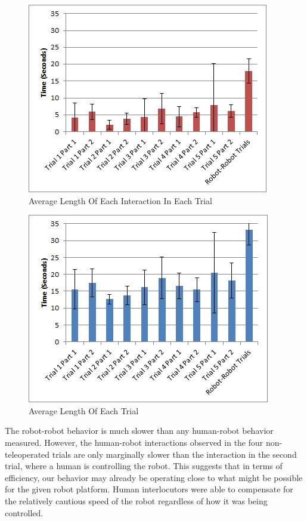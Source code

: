 \documentclass[letterpaper, 10 pt, conference]{ieeeconf}  %
\begin{document}
       \begin{figure}
      \centering
      \includegraphics{interaction_length.png}
      \caption{Average Length Of Each Interaction In Each Trial}
      \label{fig:Interaction}
   \end{figure}


     \begin{figure}
      \centering
      \includegraphics{trial_length.png}
      \caption{Average Length Of Each Trial}
      \label{fig:Trial}
   \end{figure}

The robot-robot behavior is much slower than any human-robot behavior measured. However, the human-robot interactions observed in the four non-teleoperated trials are only marginally slower than the interaction in the second trial, where a human is controlling the robot. This suggests that in terms of efficiency, our behavior may already be operating close to what might be possible for the given robot platform. Human interlocutors were able to compensate for the relatively cautious speed of the robot regardless of how it was being controlled. 
\end{document}

